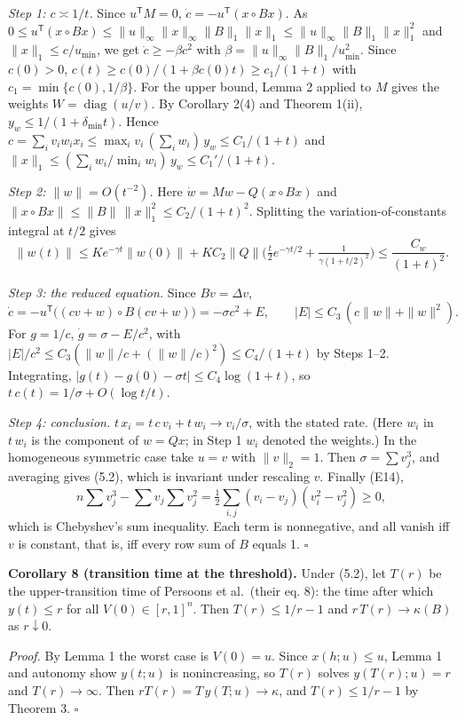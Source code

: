 \documentclass[
  11pt,
  a4paper,
]{article}
\begin{document}
\emph{Step 1: \(c\asymp1/t\).} Since \(u^{\mathsf T}M=0\),
\(\dot c=-u^{\mathsf T}(x\circ Bx)\). As
\(0\le u^{\mathsf T}(x\circ Bx)\le\|u\|_\infty\|x\|_\infty\|B\|_1\|x\|_1\le\|u\|_\infty\|B\|_1\|x\|_1^2\)
and \(\|x\|_1\le c/u_{\min}\), we get \(\dot c\ge-\beta c^2\) with
\(\beta=\|u\|_\infty\|B\|_1/u_{\min}^2\). Since \(c(0)>0\),
\(c(t)\ge c(0)/(1+\beta c(0)t)\ge c_1/(1+t)\) with
\(c_1=\min\{c(0),1/\beta\}\). For the upper bound, Lemma 2 applied to
\(M\) gives the weights \(W=\operatorname{diag}(u/v)\). By Corollary
2(4) and Theorem 1(ii), \(y_w\le1/(1+\delta_{\min}t)\). Hence
\(c=\sum_iv_iw_ix_i\le\max_iv_i\,(\sum_iw_i)\,y_w\le C_1/(1+t)\) and
\(\|x\|_1\le(\sum_iw_i/\min_iw_i)\,y_w\le C_1'/(1+t)\).

\emph{Step 2: \(\|w\|=O(t^{-2})\).} Here \(\dot w=Mw-Q(x\circ Bx)\) and
\(\|x\circ Bx\|\le\|B\|\,\|x\|_1^2\le C_2/(1+t)^2\). Splitting the
variation-of-constants integral at \(t/2\) gives
\[\|w(t)\|\le Ke^{-\gamma t}\|w(0)\|+KC_2\|Q\|\Big(\tfrac t2e^{-\gamma t/2}+\tfrac{1}{\gamma(1+t/2)^2}\Big)\le\frac{C_w}{(1+t)^2}.\]

\emph{Step 3: the reduced equation.} Since \(Bv=\Delta v\),
\[\dot c=-u^{\mathsf T}\big((cv+w)\circ B(cv+w)\big)=-\sigma c^2+E,\qquad|E|\le C_3\,(c\|w\|+\|w\|^2).\]
For \(g=1/c\), \(\dot g=\sigma-E/c^2\), with
\(|E|/c^2\le C_3(\|w\|/c+(\|w\|/c)^2)\le C_4/(1+t)\) by Steps 1--2.
Integrating, \(|g(t)-g(0)-\sigma t|\le C_4\log(1+t)\), so
\(t\,c(t)=1/\sigma+O(\log t/t)\).

\emph{Step 4: conclusion.} \(t\,x_i=t\,c\,v_i+t\,w_i\to v_i/\sigma\),
with the stated rate. (Here \(w_i\) in \(t\,w_i\) is the component of
\(w=Qx\); in Step 1 \(w_i\) denoted the weights.) In the homogeneous
symmetric case take \(u=v\) with \(\|v\|_2=1\). Then
\(\sigma=\sum v_j^3\), and averaging gives (5.2), which is invariant
under rescaling \(v\). Finally (E14),
\[n\sum v_j^3-\sum v_j\sum v_j^2=\tfrac12\sum_{i,j}(v_i-v_j)(v_i^2-v_j^2)\ge0,\]
which is Chebyshev's sum inequality. Each term is nonnegative, and all
vanish iff \(v\) is constant, that is, iff every row sum of \(B\) equals
1. \(\square\)

\textbf{Corollary 8 (transition time at the threshold).} Under (5.2),
let \(T(r)\) be the upper-transition time of Persoons et al.~(their eq.
8): the time after which \(y(t)\le r\) for all \(V(0)\in[r,1]^n\). Then
\(T(r)\le1/r-1\) and \(r\,T(r)\to\kappa(B)\) as \(r\downarrow0\).

\emph{Proof.} By Lemma 1 the worst case is \(V(0)=u\). Since
\(x(h;u)\le u\), Lemma 1 and autonomy show \(y(t;u)\) is nonincreasing,
so \(T(r)\) solves \(y(T(r);u)=r\) and \(T(r)\to\infty\). Then
\(rT(r)=T\,y(T;u)\to\kappa\), and \(T(r)\le1/r-1\) by Theorem 3.
\(\square\)
\end{document}
